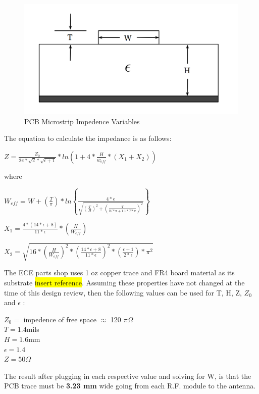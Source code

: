\documentclass[letterpaper,10pt]{article}
\begin{document}
\begin{spacing}{1.15}
\begin{figure} [H]
	\centering
	\includegraphics[scale=0.3]{PCB_Trace_Figure.png}
	\caption{PCB Microstrip Impedence Variables\label{fig:pcb-trace}}
\end{figure}

The equation to calculate the impedance is as follows:
\begin{center}
\large$Z = \frac{Z_0}{2\pi*\sqrt{2}*\sqrt{\epsilon+ 1}} * ln\left(1 + 4*\frac{H}{w_{eff}} * \left(X_1 + X_2 \right )\right )$
\end{center}
where
\begin{center}
	\large $W_{eff} = W + \left(\frac{T}{\pi}\right)*ln\left \{\frac{4*e}{\sqrt{\left(\frac{T}{H}\right)^2 + \left (\frac{T}{W*\pi + 1.1*T*\pi }  \right )^{2}}} \right \}$
	
	\vspace{2.5mm}
	
	$X_1 = \frac{4*\left( 14*\epsilon +8\right)}{11*\epsilon} * \left(\frac{H}{W_{eff}} \right)$
	
	\vspace{2.5mm}
	
	$X_2 = \sqrt{16*\left(\frac{H}{W_{eff}} \right )^2 * \left(\frac{14*\epsilon+8}{11*\epsilon} \right )^2 * \left(\frac{\epsilon + 1}{2*\epsilon} \right ) * \pi^2}$
\end{center}

The ECE parts shop uses 1 oz copper trace and FR4 board material as its substrate \hl{insert reference}. Assuming these properties have not changed at the time of this design review, then the following values can be used for T, H, Z, $Z_0$ and $\epsilon$ :
\begin{center}
	$Z_0 =$ impedence of free space $\approx$ 120 $\pi \Omega$ \\
	$T = 1.4 $mils\\
	$H =1.6 $mm\\
	$\epsilon = 1.4$ \\
	$Z = 50 \Omega$
\end{center}
The result after plugging in each respective value and solving for W, is that the PCB trace must be \textbf{3.23 mm} wide going from each R.F. module to the antenna.



\end{spacing}
\end{document}
